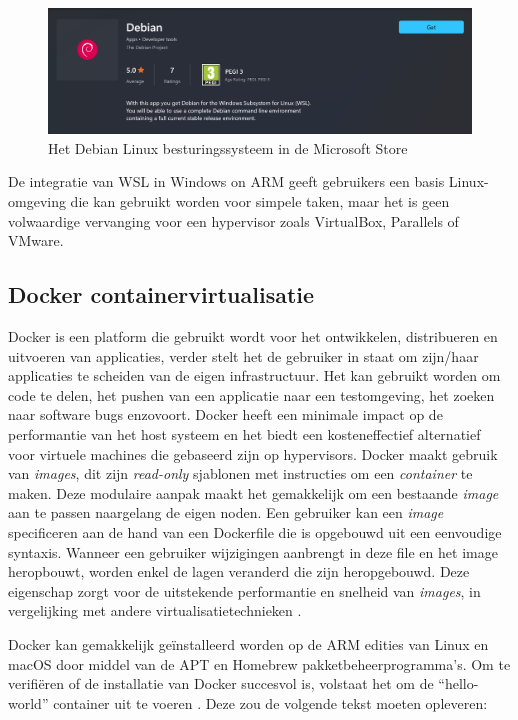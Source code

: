 \begin{figure}[!h]
	\centering
	\includegraphics[width=\linewidth]{img/debian.png}
	\caption{Het Debian Linux besturingssysteem in de Microsoft Store}
\end{figure}

De integratie van WSL in Windows on ARM geeft gebruikers een basis Linux-omgeving die kan gebruikt worden voor simpele taken, maar het is geen volwaardige vervanging voor een hypervisor zoals VirtualBox, Parallels of VMware.

\subsection{Docker containervirtualisatie}
Docker is een platform die gebruikt wordt voor het ontwikkelen, distribueren en uitvoeren van applicaties, verder stelt het de gebruiker in staat om zijn/haar applicaties te scheiden van de eigen infrastructuur. Het kan gebruikt worden om code te delen, het pushen van een applicatie naar een testomgeving, het zoeken naar software bugs enzovoort. Docker heeft een minimale impact op de performantie van het host systeem en het biedt een kosteneffectief alternatief voor virtuele machines die gebaseerd zijn op hypervisors. Docker maakt gebruik van \textit{images}, dit zijn \textit{read-only} sjablonen met instructies om een \textit{container} te maken. Deze modulaire aanpak maakt het gemakkelijk om een bestaande \textit{image} aan te passen naargelang de eigen noden. Een gebruiker kan een \textit{image} specificeren aan de hand van een Dockerfile die is opgebouwd uit een eenvoudige syntaxis. Wanneer een gebruiker wijzigingen aanbrengt in deze file en het image heropbouwt, worden enkel de lagen veranderd die zijn heropgebouwd. Deze eigenschap zorgt voor de uitstekende performantie en snelheid van \textit{images}, in vergelijking met andere virtualisatietechnieken \autocite{Docker2020}.

Docker kan gemakkelijk geïnstalleerd worden op de ARM edities van Linux en macOS door middel van de APT en Homebrew pakketbeheerprogramma’s. Om te verifiëren of de installatie van Docker succesvol is, volstaat het om de “hello-world” container uit te voeren \autocite{Andrews2019}. Deze zou de volgende tekst moeten opleveren:

